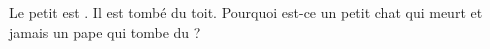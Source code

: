 \beginnumbering
\pstart
Le petit  est .
Il est tombé du toit.
Pourquoi est-ce  un petit chat qui meurt et jamais un pape qui tombe du   ?
\pend
\endnumbering
